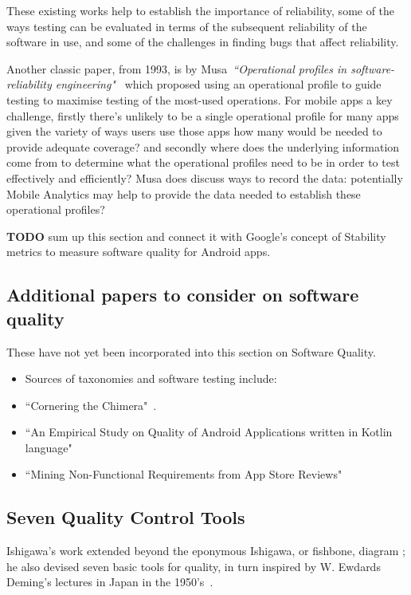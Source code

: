 These existing works help to establish the importance of reliability, some of the ways testing can be evaluated in terms of the subsequent reliability of the software in use, and some of the challenges in finding bugs that affect reliability. 

Another classic paper, from 1993, is by Musa~\emph{``Operational profiles in software-reliability engineering"}~ which proposed using an operational profile to guide testing to maximise testing of the most-used operations. For mobile apps a key challenge, firstly there's unlikely to be a single operational profile for many apps given the variety of ways users use those apps how many would be needed to provide adequate coverage? and secondly where does the underlying information come from to determine what the operational profiles need to be in order to test effectively and efficiently? Musa does discuss ways to record the data: potentially Mobile Analytics may help to provide the data needed to establish these operational profiles? 

\textbf{TODO} sum up this section and connect it with Google's concept of Stability metrics to measure software quality for Android apps.

\subsection{Additional papers to consider on software quality}
These have not yet been incorporated into this section on Software Quality.
\begin{itemize}
    \item Sources of taxonomies and software testing include:~\cite{foidl2018_integrating_software_quality_models_into_risk_based_testing} 
    \item ``Cornering the Chimera"~\cite{dromey1996_cornering_the_chimera}.
    \item ``An Empirical Study on Quality of Android Applications written in Kotlin language"
    \item ``Mining Non-Functional Requirements from App Store Reviews"

\end{itemize}

\subsection{Seven Quality Control Tools}
Ishigawa's work extended beyond the eponymous Ishigawa, or fishbone, diagram %
; he also devised seven basic tools for quality, in turn inspired by W. Ewdards Deming's lectures in Japan in the 1950's~\cite{7_basic_quality_tools_with_R}.

